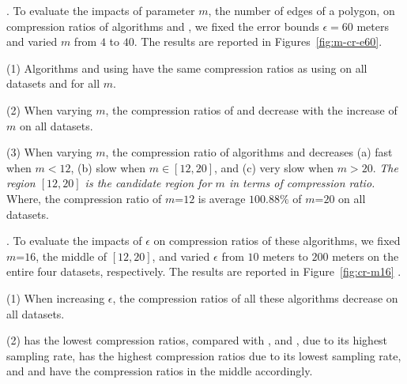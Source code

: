 .
To evaluate the impacts of parameter $m$, the number of edges of a polygon, on compression ratios of algorithms \cist and \cista, we fixed the error bounds {$\epsilon =60$ meters} and varied $m$ from $4$ to $40$.
The results are reported in Figures~\ref{fig:m-cr-e60}.

\ni(1) Algorithms \cist and \cista using \rpia have the same compression ratios as using \cpia on all datasets and for all $m$.

\ni(2) When varying $m$, the compression ratios of \cist and \cista decrease with the increase of $m$ on all datasets.

\ni(3) When varying $m$, the compression ratio of algorithms \cist and \cista decreases (a) fast when $m < 12$, (b) slow when $m \in [12, 20]$, and (c) very slow when $m > 20$.
\emph{The region $[12, 20]$ is the candidate region for $m$ in terms of compression ratio.}
Where, the compression ratio of $m$=$12$ is average {$100.88\%$} of $m$=$20$ on all datasets.



.
To evaluate the impacts of $\epsilon$ on compression ratios of these algorithms, we fixed {$m$=$16$}, the middle of $[12, 20]$, and varied $\epsilon$ from $10$ meters to $200$ meters on the entire four datasets, respectively.
The results are reported in Figure~\ref{fig:cr-m16} .


\ni (1) When increasing $\epsilon$, the compression ratios of all these algorithms decrease on all datasets.

\ni (2) \pricar has the lowest compression ratios, compared with \truck, \sercar and \geolife, due to its highest sampling rate,
\truck has the highest compression ratios due to its lowest sampling rate, and \sercar and \geolife have the compression ratios in the middle accordingly.

